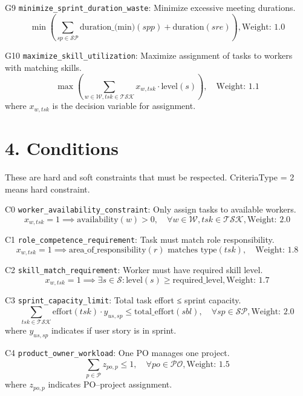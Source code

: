 \documentclass[11pt]{article}
\begin{document}
    \item[G9] \texttt{minimize\_sprint\_duration\_waste}: Minimize excessive meeting durations.
    \[
    \min \left( \sum_{sp \in \mathcal{SP}} \text{duration\_(min)}(spp) + \text{duration}(sre) \right), \text{Weight: } 1.0
    \]
    
    \item[G10] \texttt{maximize\_skill\_utilization}: Maximize assignment of tasks to workers with matching skills.
    \[
    \max \left( \sum_{w \in \mathcal{W}, tsk \in \mathcal{TSK}} x_{w,tsk} \cdot \text{level}(s) \right), \quad \text{Weight: } 1.1
    \]
    where $x_{w,tsk}$ is the decision variable for assignment.

\section{4. Conditions}
These are hard and soft constraints that must be respected. CriteriaType = 2 means hard constraint.

\item[C0] \texttt{worker\_availability\_constraint}: Only assign tasks to available workers.
    \[
    x_{w,tsk} = 1 \implies \text{availability}(w) > 0, \quad \forall w \in \mathcal{W}, tsk \in \mathcal{TSK}, \text{Weight: } 2.0
    \]
    
    \item[C1] \texttt{role\_competence\_requirement}: Task must match role responsibility.
    \[
    x_{w,tsk} = 1 \implies \text{area\_of\_responsibility}(r) \text{ matches } \text{type}(tsk), \quad \text{Weight: } 1.8
    \]
    
    \item[C2] \texttt{skill\_match\_requirement}: Worker must have required skill level.
    \[
    x_{w,tsk} = 1 \implies \exists s \in \mathcal{S} : \text{level}(s) \geq \text{required\_level}, \text{Weight: } 1.7
    \]
    
    \item[C3] \texttt{sprint\_capacity\_limit}: Total task effort ≤ sprint capacity.
    \[
    \sum_{tsk \in \mathcal{TSK}} \text{effort}(tsk) \cdot y_{us,sp} \leq \text{total\_effort}(sbl), \quad \forall sp \in \mathcal{SP}, \text{Weight: } 2.0
    \]
    where $y_{us,sp}$ indicates if user story is in sprint.
    
    \item[C4] \texttt{product\_owner\_workload}: One PO manages one project.
    \[
    \sum_{p \in \mathcal{P}} z_{po,p} \leq 1, \quad \forall po \in \mathcal{PO}, \text{Weight: } 1.5
    \]
    where $z_{po,p}$ indicates PO–project assignment.
    
\end{document}

